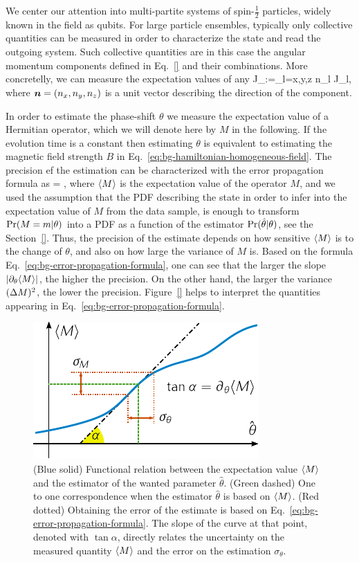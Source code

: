 We center our attention into multi-partite systems of spin-$\frac{1}{2}$ particles, widely known in the field as qubits.
For large particle ensembles, typically only collective quantities can be measured in order to characterize the state and read the outgoing system.
Such collective quantities are in this case the angular momentum components defined in Eq.~\eqref{} and their combinations.
More concretelly, we can measure the expectation values of any
\be
  J_{}:=\sum_{l=x,y,z} n_l J_l,
\ee
where $\boldsymbol{n}=(n_x,n_y,n_z)$ is a unit vector describing the direction of the component.

In order to estimate the phase-shift $\theta$ we measure the expectation value of a Hermitian operator, which we will denote here by $M$ in the following.
If the evolution time is a constant then estimating $\theta$ is equivalent to estimating the magnetic field strength $B$ in Eq.~\eqref{eq:bg-hamiltonian-homogeneous-field}.
The precision ef the estimation can be characterized with the error propagation formula as
\be
  \label{eq:bg-error-propagation-formula}
  \varian{\theta} = ,
\ee
where $\langle M \rangle$ is the expectation value of the operator $M$, and we used the assumption that the PDF describing the state in order to infer into the expectation value of $M$ from the data sample, is enough to transform $\text{Pr}(M=m|\theta)$ into a PDF as a function of the estimator $\text{Pr}(\hat{\theta}|\theta)$, see the Section~\ref{}.
Thus, the precision of the estimate depends on how sensitive $\langle M \rangle$ is to the change of $\theta$, and also on how large the variance of $M$ is.
Based on the formula Eq.~\eqref{eq:bg-error-propagation-formula}, one can see that the larger the slope $|\partial_\theta \langle M \rangle|$, the higher the precision.
On the other hand, the larger the variance $(\Delta M )^2$, the lower the precision.
Figure~\ref{} helps to interpret the quantities appearing in Eq.~\eqref{eq:bg-error-propagation-formula}.
\begin{figure}
  \centering
  \includegraphics[scale=1.4]{img/BG_expect_m_evo.pdf}
  \caption[Graphical explanation of the error-propagation formula]{(Blue solid) Functional relation between the expectation value $\langle M \rangle$ and the estimator of the wanted parameter $\hat\theta$.
  (Green dashed) One to one correspondence when the estimator $\hat{\theta}$ is based on $\langle M \rangle$. (Red dotted) Obtaining the error of the estimate is based on Eq.~\eqref{eq:bg-error-propagation-formula}.
  The slope of the curve at that point, denoted with $\tan\alpha$, directly relates the uncertainty on the measured quantity $\langle M \rangle$ and the error on the estimation $\sigma_\theta$.}
  \label{fig:bg-expect-m-evo}
\end{figure}

